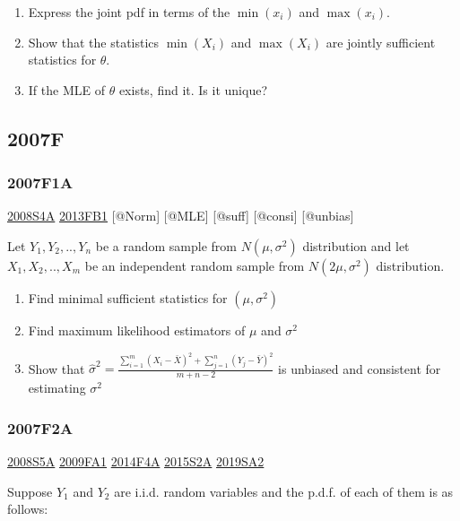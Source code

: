 \documentclass[6pt,Portrait]{article}
\begin{document}
\begin{enumerate}
\def\labelenumi{(\alph{enumi})}
\item
  Express the joint pdf in terms of the \(\min(x_i)\) and \(\max(x_i)\).
\item
  Show that the statistics \(\min(X_i)\) and \(\max(X_i)\) are jointly
  sufficient statistics for \(\theta\).
\item
  If the MLE of \(\theta\) exists, find it. Is it unique?
\end{enumerate}

\hypertarget{f-3}{%
\subsection{2007F}\label{f-3}}

\hypertarget{f1a}{%
\subsubsection{2007F1A}\label{f1a}}

\protect\hyperlink{s4a}{2008S4A} \protect\hyperlink{fb1-2}{2013FB1}
{[}@Norm{]} {[}@MLE{]} {[}@suff{]} {[}@consi{]} {[}@unbias{]}

Let \(Y_1,Y_2,..,Y_{n}\) be a random sample from \(N(\mu,\sigma^2)\)
distribution and let \(X_1,X_2,..,X_{m}\) be an independent random
sample from \(N(2\mu,\sigma^2)\) distribution.

\begin{enumerate}
\def\labelenumi{(\alph{enumi})}
\item
  Find minimal sufficient statistics for \((\mu,\sigma^2)\)
\item
  Find maximum likelihood estimators of \(\mu\) and \(\sigma^2\)
\item
  Show that
  \(\hat\sigma^2=\frac{\sum_{i=1}^m(X_i-\bar X)^2+\sum_{j=1}^n(Y_j-\bar Y)^2}{m+n-2}\)
  is unbiased and consistent for estimating \(\sigma^2\)
\end{enumerate}

\hypertarget{f2a}{%
\subsubsection{2007F2A}\label{f2a}}

\protect\hyperlink{s5a}{2008S5A} \protect\hyperlink{fa1}{2009FA1}
\protect\hyperlink{f4a-1}{2014F4A} \protect\hyperlink{s2a-1}{2015S2A}
\protect\hyperlink{sa2-3}{2019SA2}

Suppose \(Y_1\) and \(Y_2\) are i.i.d. random variables and the p.d.f.
of each of them is as follows:
\end{document}
